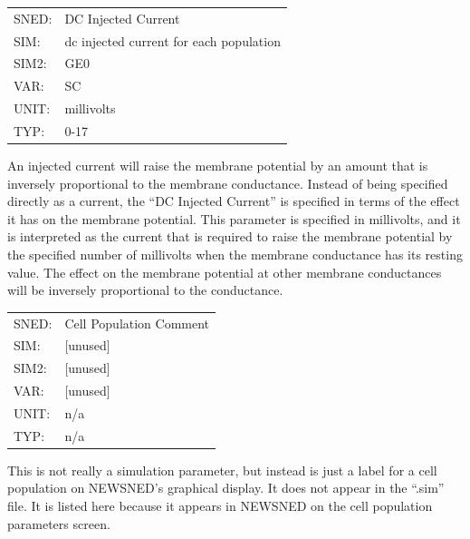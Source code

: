 \documentclass[12pt,openany,oneside]{book}
\begin{document}
\begin{flushleft}
\begin{tabular}{@{}ll@{}}
SNED: & DC Injected Current\\
SIM: & dc injected current for each population\\
SIM2: & GE0\\
VAR: & SC\\
UNIT: & millivolts\\
TYP: & 0-17\\
\end{tabular}
\end{flushleft}
\noindent
An injected current will raise the membrane potential by an amount
that is inversely proportional to the membrane conductance.  Instead
of being specified directly as a current, the ``DC Injected Current''
is specified in terms of the effect it has on the membrane potential.
This parameter is specified in millivolts, and it is interpreted as
the current that is required to raise the membrane potential by the
specified number of millivolts when the membrane conductance has its
resting value.  The effect on the membrane potential at other membrane
conductances will be inversely proportional to the conductance.
\filbreak
\vspace{\baselineskip}

\begin{flushleft}
\begin{tabular}{@{}ll@{}}
SNED: & Cell Population Comment\\
SIM: & [unused]\\
SIM2: & [unused]\\
VAR: & [unused]\\
UNIT: & n/a\\
TYP: & n/a\\
\end{tabular}
\end{flushleft}
\noindent
This is not really a simulation parameter, but instead is just a label for a cell
population on NEWSNED's graphical display.  It does not appear in the
``.sim'' file.  It is listed here because it appears in NEWSNED on the
cell population parameters screen.
\filbreak
\vspace{\baselineskip}
\end{document}
